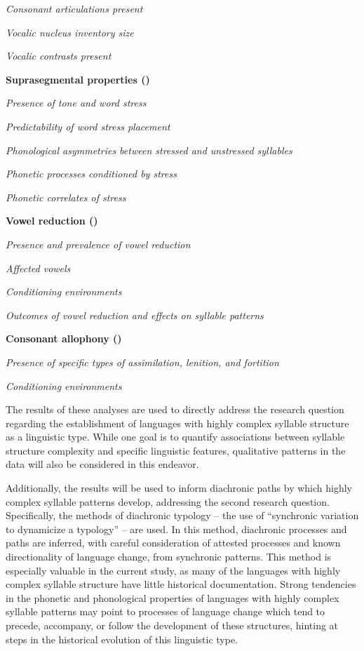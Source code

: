 \textit{Consonant articulations present}

\textit{Vocalic nucleus inventory size}

\textit{Vocalic contrasts present}

\textbf{Suprasegmental properties ()}

\textit{Presence of tone and word stress}

\textit{Predictability of word stress placement}

\textit{Phonological asymmetries between stressed and unstressed syllables}

\textit{Phonetic processes conditioned by stress}

\textit{Phonetic correlates of stress}

\textbf{Vowel reduction ()}

\textit{Presence and prevalence of vowel reduction}

\textit{Affected vowels}

\textit{Conditioning environments}

\textit{Outcomes of vowel reduction and effects on syllable patterns}

\textbf{Consonant allophony ()}

\textit{Presence of specific types of assimilation, lenition, and fortition}

\textit{Conditioning environments}
\z

  The results of these analyses are used to directly address the research question regarding the establishment of languages with highly complex syllable structure as a linguistic type. While one goal is to quantify associations between syllable structure complexity and specific linguistic features, qualitative patterns in the data will also be considered in this endeavor.

  Additionally, the results will be used to inform diachronic paths by which highly complex syllable patterns develop, addressing the second research question. Specifically, the methods of diachronic typology -- the use of “synchronic variation to dynamicize a typology” \citep[272]{Croft2003} -- are used. In this method, diachronic processes and paths are inferred, with careful consideration of attested processes and known directionality of language change, from synchronic patterns. This method is especially valuable in the current study, as many of the languages with highly complex syllable structure have little historical documentation. Strong tendencies in the phonetic and phonological properties of languages with highly complex syllable patterns may point to processes of language change which tend to precede, accompany, or follow the development of these structures, hinting at steps in the historical evolution of this linguistic type.

